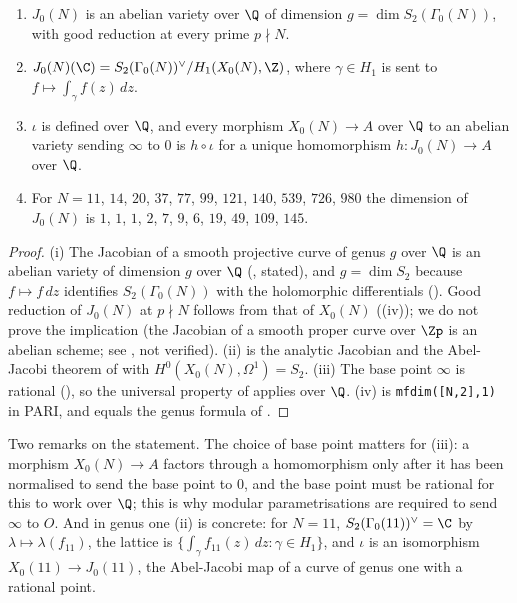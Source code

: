 \begin{theorem}[structure of $J_0(N)$]\label{thm:moddeg:j0}
\leavevmode
\begin{enumerate}[label=(\roman*)]
\item $J_0(N)$ is an abelian variety over $\Q$ of dimension $g=\dim S_2(\Gamma_0(N))$, with good reduction at every prime $p\nmid N$.
\item $J_0(N)(\C)=S_2(\Gamma_0(N))^\vee/H_1(X_0(N),\Z)$, where $\gamma\in H_1$ is sent to $f\mapsto\int_\gamma f(z)\,dz$.
\item $\iota$ is defined over $\Q$, and every morphism $X_0(N)\to A$ over $\Q$ to an abelian variety sending $\infty$ to $0$ is $h\circ\iota$ for a unique homomorphism
$h\colon J_0(N)\to A$ over $\Q$.
\item For $N=11$, $14$, $20$, $37$, $77$, $99$, $121$, $140$, $539$, $726$, $980$ the dimension of $J_0(N)$ is $1$, $1$, $1$, $2$, $7$, $9$, $6$, $19$, $49$, $109$, $145$.
\end{enumerate}
\end{theorem}

\begin{proof}
(i) The Jacobian of a smooth projective curve of genus $g$ over $\Q$ is an abelian variety of dimension $g$ over $\Q$ (, stated), and $g=\dim S_2$ because
$f\mapsto f\,dz$ identifies $S_2(\Gamma_0(N))$ with the holomorphic differentials (). Good reduction of $J_0(N)$ at $p\nmid N$ follows from that of $X_0(N)$
((iv)); we do not prove the implication (the Jacobian of a smooth proper curve over $\Zp$ is an abelian scheme; see \cite[Section 9.4]{BLR}, not verified).
(ii) is the analytic Jacobian and the Abel-Jacobi theorem of  with $H^0(X_0(N),\Omega^1)=S_2$. (iii) The base point $\infty$ is rational
(), so the universal property of  applies over $\Q$. (iv) is \texttt{mfdim([N,2],1)} in PARI, and equals the genus formula of
.
\end{proof}

Two remarks on the statement. The choice of base point matters for (iii): a morphism $X_0(N)\to A$ factors through a homomorphism only after it has been normalised to send the base
point to $0$, and the base point must be rational for this to work over $\Q$; this is why modular parametrisations are required to send $\infty$ to $O$. And in genus one (ii) is
concrete: for $N=11$, $S_2(\Gamma_0(11))^\vee=\C$ by $\lambda\mapsto\lambda(f_{11})$, the lattice is $\{\int_\gamma f_{11}(z)\,dz:\gamma\in H_1\}$, and $\iota$ is an isomorphism
$X_0(11)\to J_0(11)$, the Abel-Jacobi map of a curve of genus one with a rational point.

